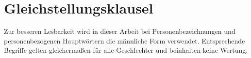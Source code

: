 \chapter*{Gleichstellungsklausel}
\thispagestyle{empty}
Zur besseren Lesbarkeit wird in dieser Arbeit bei Personenbezeichnungen und personenbezogenen Hauptwörtern die männliche Form verwendet. Entsprechende Begriffe gelten gleichermaßen für alle Geschlechter und beinhalten keine Wertung.
